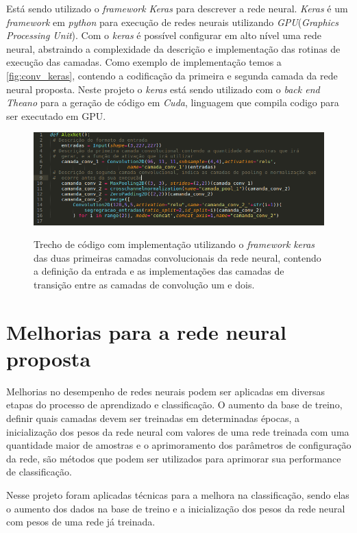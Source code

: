 \par Está sendo utilizado o \textit{framework} \textit{Keras} \cite{chollet2015keras} para descrever a rede neural. \textit{Keras} é um \textit{framework} em \textit{python} para execução de redes neurais utilizando \textit{GPU}(\textit{Graphics Processing Unit}). Com o \textit{keras} é possível configurar em alto nível uma rede neural, abstraindo a complexidade da descrição e implementação das rotinas de execução das camadas. Como exemplo de implementação temos a \autoref{fig:conv_keras}, contendo a codificação da primeira e segunda camada da rede neural proposta. Neste projeto o \textit{keras} está sendo utilizado com o \textit{back end Theano} \cite{2016arXiv160502688full} para a geração de código em \textit{Cuda}, linguagem que compila codigo para ser executado em GPU.
\begin{figure}[H]
  \centering
  \caption{Trecho de código com implementação utilizando o \textit{framework} \textit{keras} das duas primeiras camadas convolucionais da rede neural, contendo a definição da entrada e as implementações das camadas de transição entre as camadas de convolução um e dois.}
  \includegraphics[width=400pt]{dados/figuras/exemplo_keras}
  \label{fig:conv_keras}
\end{figure}


\section{Melhorias para a rede neural proposta}

Melhorias no desempenho de redes neurais podem ser aplicadas em diversas etapas do processo de aprendizado e classificação. O aumento da base de treino, definir quais camadas devem ser treinadas em determinadas épocas, a inicialização dos pesos da rede neural com valores de uma rede treinada com uma quantidade maior de amostras e o aprimoramento dos parâmetros de configuração da rede, são métodos que podem ser utilizados para aprimorar sua performance de classificação.

\par Nesse projeto foram aplicadas técnicas para a melhora na classificação, sendo elas
o aumento dos dados na base de treino e a inicialização dos pesos da rede neural com pesos de uma rede já treinada. %

